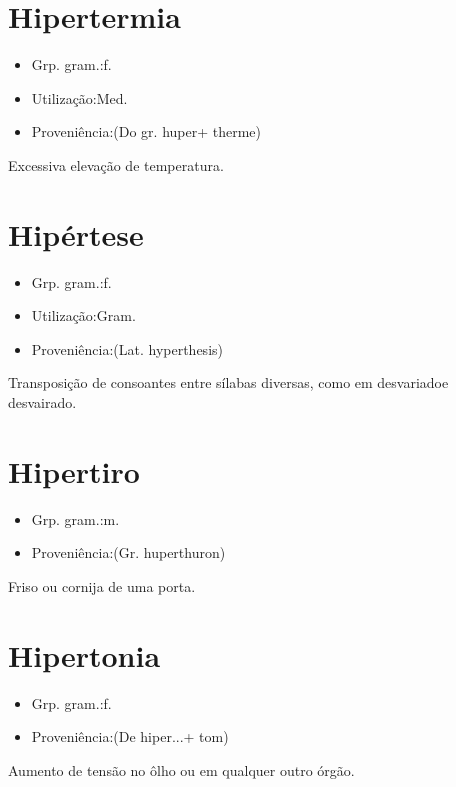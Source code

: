 \documentclass{article}
\begin{document}
\section{Hipertermia}
\begin{itemize}
\item {Grp. gram.:f.}
\end{itemize}
\begin{itemize}
\item {Utilização:Med.}
\end{itemize}
\begin{itemize}
\item {Proveniência:(Do gr. \textunderscore huper\textunderscore  + \textunderscore therme\textunderscore )}
\end{itemize}
Excessiva elevação de temperatura.
\section{Hipértese}
\begin{itemize}
\item {Grp. gram.:f.}
\end{itemize}
\begin{itemize}
\item {Utilização:Gram.}
\end{itemize}
\begin{itemize}
\item {Proveniência:(Lat. \textunderscore hyperthesis\textunderscore )}
\end{itemize}
Transposição de consoantes entre sílabas diversas, como em \textunderscore desvariado\textunderscore  e \textunderscore desvairado\textunderscore .
\section{Hipertiro}
\begin{itemize}
\item {Grp. gram.:m.}
\end{itemize}
\begin{itemize}
\item {Proveniência:(Gr. \textunderscore huperthuron\textunderscore )}
\end{itemize}
Friso ou cornija de uma porta.
\section{Hipertonia}
\begin{itemize}
\item {Grp. gram.:f.}
\end{itemize}
\begin{itemize}
\item {Proveniência:(De \textunderscore hiper...\textunderscore  + \textunderscore tom\textunderscore )}
\end{itemize}
Aumento de tensão no ôlho ou em qualquer outro órgão.
\end{document}
